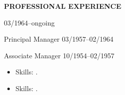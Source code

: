 %
%
%
%
%



\vspace{\spaceSection}
\begin{center}
    \textbf{PROFESSIONAL EXPERIENCE}
\end{center}
\vspace{\spaceSection}

\textbf{\expBCompany} \hfill \expBLocation

\textbf{\expBPosition} \hfill 03/1964--ongoing

Principal Manager \hfill 03/1957--02/1964

Associate Manager \hfill 10/1954--02/1957

\begin{itemize}[noitemsep, topsep=0pt, partopsep=0pt, parsep=0pt]
    \expBDetails
    \item Skills: \expBTechStack.
\end{itemize}

\vspace{\spaceSection}

\textbf{\expACompany} \hfill \expALocation

\expAPosition \hfill \expADate 

\begin{itemize}[noitemsep, topsep=0pt, partopsep=0pt, parsep=0pt]
    \expADetails
    \item Skills: \expATechStack.
\end{itemize}
